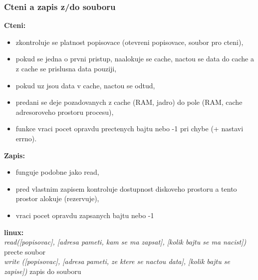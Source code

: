 \documentclass[a4paper, 11pt]{article}
\begin{document}
\subsubsection{Cteni a zapis z/do souboru}
\textbf{Cteni:}
\begin{itemize}
    \item zkontroluje se platnost popisovace (otevreni popisovace, soubor pro cteni),
    \item pokud se jedna o prvni pristup, naalokuje se cache, nactou se data do cache a z cache se prislusna data pouziji,
    \item pokud uz jsou data v cache, nactou se odtud,
    \item predani se deje pozadovanych z cache (RAM, jadro) do pole (RAM, cache adresoroveho prostoru procesu),
    \item funkce vraci pocet opravdu prectenych bajtu nebo -1 pri chybe (+ nastavi errno). \\
\end{itemize}

\textbf{Zapis:}
\begin{itemize}
    \item funguje podobne jako read,
    \item pred vlastnim zapisem kontroluje dostupnost diskoveho prostoru a tento prostor alokuje (rezervuje),
    \item vraci pocet opravdu zapsanych bajtu nebo -1 \\
\end{itemize}

\newpage

\textbf{linux:} \\[0.5em]
\textit{read([popisovac], [adresa pameti, kam se ma zapsat], [kolik bajtu se ma nacist])} precte soubor \\[0.2em]
\textit{write ([popisovac], [adresa pameti, ze ktere se nactou data], [kolik bajtu se zapise])} zapis do souboru \\
\end{document}
